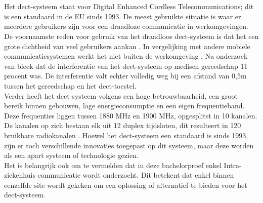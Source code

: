 \section{}%
\label{sec:dect-systeem}
Het \gls{dect}-systeem staat voor Digital Enhanced Cordless Telecommunications; dit is een standaard in de EU sinds 1993. De meest gebruikte situatie is waar er meerdere gebruikers zijn voor een draadloze communicatie in werkomgevingen. De voornaamste reden voor gebruik van het draadloos \gls{dect}-systeem is dat het een grote dichtheid van veel gebruikers aankan \autocite{Welinder1997}. In vergelijking met andere mobiele communicatiesystemen werkt het niet buiten de werkomgeving \autocite{Welinder1997}. Na onderzoek van \textcite{Welinder1997} bleek dat de interferentie van het \gls{dect}-systeem op medisch gereedschap 11 procent was. De interferentie valt echter volledig weg bij een afstand van 0,5m tussen het gereedschap en het \gls{dect}-toestel. \\
Verder heeft het \gls{dect}-systeem volgens \textcite{Welinder1997}een hoge betrouwbaarheid, een groot bereik binnen gebouwen, lage energieconsumptie en een eigen frequentieband.
Deze frequenties liggen tussen 1880 MHz en 1900 MHz, opgesplitst in 10 kanalen. De kanalen op zich bestaan elk uit 12 duplex tijdsloten, dit resulteert in 120 bruikbare radiokanalen \autocite{ETSI1999}. Hoewel het \gls{dect}-systeem een standaard is sinds 1993, zijn er toch verschillende innovaties toegepast op dit systeem, maar deze worden als een apart systeem of technologie gezien. \\
Het is belangrijk ook om te vermelden dat in deze bachelorproef enkel Intra-ziekenhuis communicatie wordt onderzocht. Dit betekent dat enkel binnen eenzelfde site wordt gekeken om een oplossing of alternatief te bieden voor het \gls{dect}-systeem.

\section{}%
\label{sec:req}%





